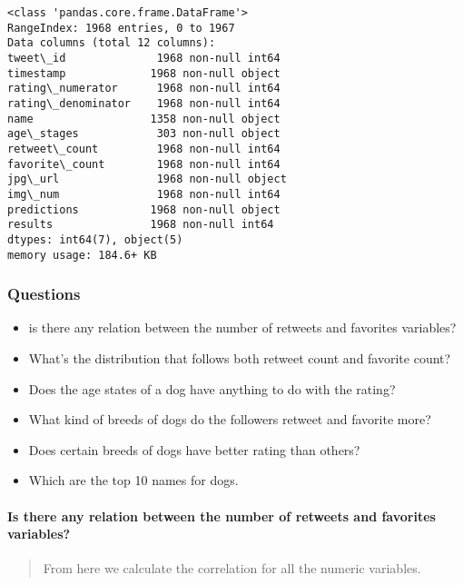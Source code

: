 \documentclass[11pt]{article}
\providecommand{\tightlist}{%
      \setlength{\itemsep}{0pt}\setlength{\parskip}{0pt}}
\begin{document}
    \begin{Verbatim}[commandchars=\\\{\}]
<class 'pandas.core.frame.DataFrame'>
RangeIndex: 1968 entries, 0 to 1967
Data columns (total 12 columns):
tweet\_id              1968 non-null int64
timestamp             1968 non-null object
rating\_numerator      1968 non-null int64
rating\_denominator    1968 non-null int64
name                  1358 non-null object
age\_stages            303 non-null object
retweet\_count         1968 non-null int64
favorite\_count        1968 non-null int64
jpg\_url               1968 non-null object
img\_num               1968 non-null int64
predictions           1968 non-null object
results               1968 non-null int64
dtypes: int64(7), object(5)
memory usage: 184.6+ KB

    \end{Verbatim}

    \subsubsection{Questions}\label{questions}

\begin{itemize}
\tightlist
\item
  is there any relation between the number of retweets and favorites
  variables?
\item
  What's the distribution that follows both retweet count and favorite
  count?
\item
  Does the age states of a dog have anything to do with the rating?
\item
  What kind of breeds of dogs do the followers retweet and favorite
  more?
\item
  Does certain breeds of dogs have better rating than others?
\item
  Which are the top 10 names for dogs.
\end{itemize}

    \paragraph{Is there any relation between the number of retweets and
favorites
variables?}\label{is-there-any-relation-between-the-number-of-retweets-and-favorites-variables}

\begin{quote}
From here we calculate the correlation for all the numeric variables.
\end{quote}
\end{document}
